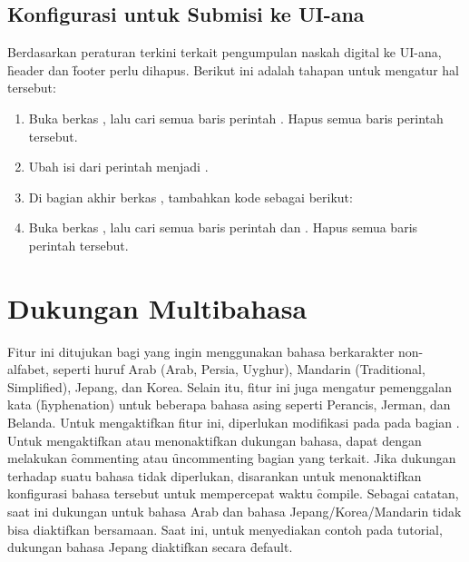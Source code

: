 \subsection{Konfigurasi untuk Submisi ke UI-ana}
\label{sec:uiana}
Berdasarkan peraturan terkini terkait pengumpulan naskah digital ke UI-ana, \f{header} dan \f{footer} perlu dihapus. Berikut ini adalah tahapan untuk mengatur hal tersebut:
\begin{enumerate}
	\item Buka berkas , lalu cari semua baris perintah . Hapus semua baris perintah tersebut.
	\item Ubah isi dari perintah  menjadi .
	\item Di bagian akhir berkas , tambahkan kode sebagai berikut:\\
    \item Buka berkas , lalu cari semua baris perintah  dan  . Hapus semua baris perintah tersebut.
\end{enumerate}

\section{Dukungan Multibahasa}
\label{sec:multilanguageSupport}

Fitur ini ditujukan bagi yang ingin menggunakan bahasa berkarakter non-alfabet, seperti huruf Arab (Arab, Persia, Uyghur), Mandarin (Traditional, Simplified), Jepang, dan Korea.
Selain itu, fitur ini juga mengatur pemenggalan kata (\f{hyphenation}) untuk beberapa bahasa asing seperti Perancis, Jerman, dan Belanda.
Untuk mengaktifkan fitur ini, diperlukan modifikasi pada  pada bagian .
Untuk mengaktifkan atau menonaktifkan dukungan bahasa, dapat dengan melakukan \f{commenting} atau \f{uncommenting} bagian yang terkait.
Jika dukungan terhadap suatu bahasa tidak diperlukan, disarankan untuk menonaktifkan konfigurasi bahasa tersebut untuk mempercepat waktu \f{compile}.
Sebagai catatan, saat ini dukungan untuk bahasa Arab dan bahasa Jepang/Korea/Mandarin tidak bisa diaktifkan bersamaan.
Saat ini, untuk menyediakan contoh pada tutorial, dukungan bahasa Jepang diaktifkan secara \f{default}.

